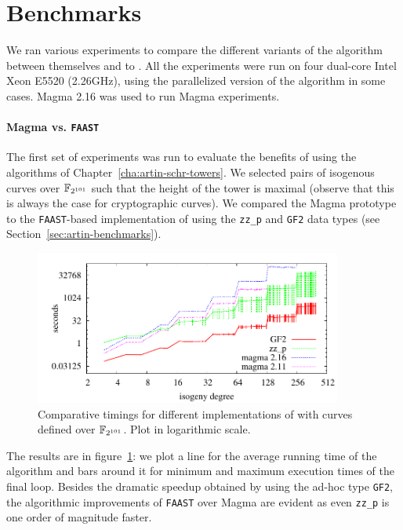 \section{Benchmarks}
\label{sec:benchmarks}
We ran various experiments to compare the different variants of the
algorithm \ctwo{} between themselves and to . All
the experiments were run on four dual-core Intel Xeon E5520 (2.26GHz),
using the parallelized version of the algorithm in some cases. Magma
2.16 was used to run Magma experiments.

\paragraph{Magma vs. \texttt{FAAST}}
\label{sec:magma-vs.-textttf}
The first set of experiments was run to evaluate the benefits of using
the algorithms of Chapter~\ref{cha:artin-schr-towers}. We selected
pairs of isogenous curves over $\mathbb{F}_{2^{101}}$ such that the height of
the tower is maximal (observe that this is always the case for
cryptographic curves).  We compared the Magma prototype to the
\texttt{FAAST}-based implementation of \ctwoasfimc{} using the
\texttt{zz\_p} and \texttt{GF2} data types (see
Section~\ref{sec:artin-benchmarks}).

\begin{figure}
  \centering
  \includegraphics[width=0.9\textwidth]{isogeny/p2}
  \caption{Comparative timings for different implementations of \ctwoasfimc{} with curves defined over $\mathbb{F}_{2^{101}}$. Plot in logarithmic scale.}
  \label{fig:2-101}
\end{figure}

The results are in figure~\ref{fig:2-101}: we plot a line for the
average running time of the algorithm and bars around it for minimum
and maximum execution times of the final loop. Besides the dramatic
speedup obtained by using the ad-hoc type \texttt{GF2}, the
algorithmic improvements of \texttt{FAAST} over Magma are evident as
even \texttt{zz\_p} is one order of magnitude faster.

